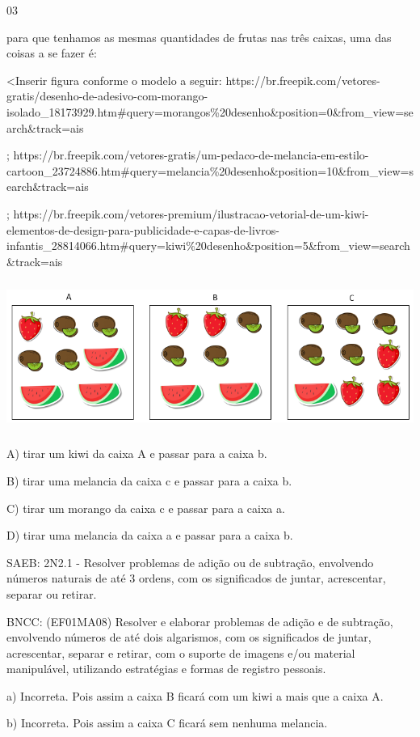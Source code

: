 \begin{itemize}
\begin{itemize}
\num{03}

para que tenhamos as mesmas quantidades de frutas nas três caixas, uma
das coisas a se fazer é:

\textless{}Inserir figura conforme o modelo a seguir:
https://br.freepik.com/vetores-gratis/desenho-de-adesivo-com-morango-isolado\_18173929.htm\#query=morangos\%20desenho\&position=0\&from\_view=search\&track=ais

;
https://br.freepik.com/vetores-gratis/um-pedaco-de-melancia-em-estilo-cartoon\_23724886.htm\#query=melancia\%20desenho\&position=10\&from\_view=search\&track=ais

;
https://br.freepik.com/vetores-premium/ilustracao-vetorial-de-um-kiwi-elementos-de-design-para-publicidade-e-capas-de-livros-infantis\_28814066.htm\#query=kiwi\%20desenho\&position=5\&from\_view=search\&track=ais

\includegraphics[width=5.90556in,height=1.93194in]{media/image152.png}

A) tirar um kiwi da caixa A e passar para a caixa b.

B) tirar uma melancia da caixa c e passar para a caixa b.

C) tirar um morango da caixa c e passar para a caixa a.

D) tirar uma melancia da caixa a e passar para a caixa b.

SAEB: 2N2.1 - Resolver problemas de adição ou de subtração, envolvendo
números naturais de até 3 ordens, com os significados de juntar,
acrescentar, separar ou retirar.

BNCC: (EF01MA08) Resolver e elaborar problemas de adição e de subtração,
envolvendo números de até dois algarismos, com os significados de
juntar, acrescentar, separar e retirar, com o suporte de imagens e/ou
material manipulável, utilizando estratégias e formas de registro
pessoais.

a) Incorreta. Pois assim a caixa B ficará com um kiwi a mais que a caixa
A.

b) Incorreta. Pois assim a caixa C ficará sem nenhuma melancia.


\end{itemize}
\end{itemize}
